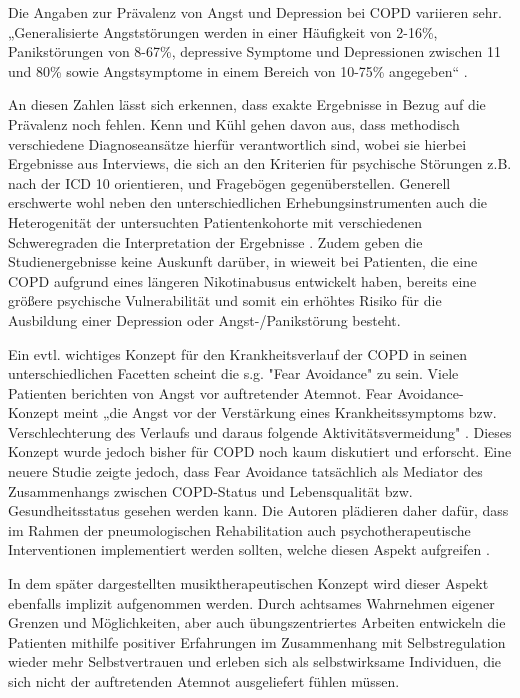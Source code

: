 Die Angaben zur Prävalenz von Angst und Depression bei COPD variieren sehr. „Generalisierte Angststörungen werden in einer Häufigkeit von 2-16\%, Panikstörungen von 8-67\%, depressive Symptome und Depressionen zwischen 11 und 80\% sowie Angstsymptome in einem Bereich von 10-75\% angegeben“  \autocite[34]{kenn2011}.

An diesen Zahlen lässt sich erkennen, dass exakte Ergebnisse in Bezug auf die Prävalenz noch fehlen. Kenn und Kühl gehen davon aus, dass methodisch verschiedene Diagnoseansätze hierfür verantwortlich sind, wobei sie hierbei Ergebnisse aus Interviews, die sich an den Kriterien für psychische Störungen z.B. nach der ICD 10 orientieren, und Fragebögen gegenüberstellen. Generell erschwerte wohl neben den unterschiedlichen Erhebungsinstrumenten auch die Heterogenität der untersuchten Patientenkohorte mit verschiedenen Schweregraden die Interpretation der Ergebnisse \autocite[vgl.][35]{kenn2011}.
Zudem geben die Studienergebnisse keine Auskunft darüber, in wieweit bei Patienten, die eine COPD aufgrund eines längeren Nikotinabusus entwickelt haben, bereits eine größere psychische Vulnerabilität und somit ein erhöhtes Risiko für die Ausbildung einer Depression oder Angst-/Panikstörung besteht. 

Ein evtl. wichtiges Konzept für den Krankheitsverlauf der COPD in seinen unterschiedlichen Facetten scheint die s.g. "Fear Avoidance" zu sein. Viele Patienten berichten von Angst vor auftretender Atemnot. Fear Avoidance- Konzept meint „die Angst vor der Verstärkung eines Krankheitssymptoms bzw. Verschlechterung des Verlaufs und daraus folgende Aktivitätsvermeidung" \autocite[111]{stenzel2013}. Dieses Konzept wurde jedoch bisher für COPD noch kaum diskutiert und erforscht. Eine neuere Studie zeigte jedoch, dass Fear Avoidance tatsächlich als Mediator des Zusammenhangs zwischen COPD-Status und Lebensqualität bzw. Gesundheitsstatus gesehen werden kann. Die Autoren plädieren daher dafür, dass im Rahmen der pneumologischen Rehabilitation auch psychotherapeutische Interventionen implementiert werden sollten, welche diesen Aspekt aufgreifen \autocite[112]{stenzel2013}. 

In dem später dargestellten musiktherapeutischen Konzept wird dieser Aspekt ebenfalls implizit aufgenommen werden. Durch achtsames Wahrnehmen eigener Grenzen und Möglichkeiten, aber auch übungszentriertes Arbeiten entwickeln die Patienten mithilfe positiver Erfahrungen im Zusammenhang mit Selbstregulation wieder mehr Selbstvertrauen und erleben sich als selbstwirksame Individuen, die sich nicht der auftretenden Atemnot ausgeliefert fühlen müssen.

